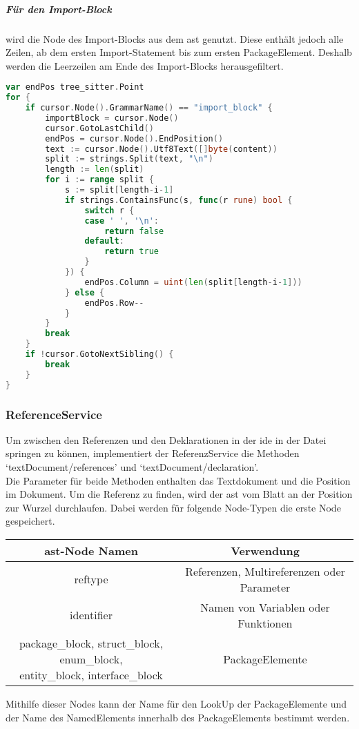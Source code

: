 \documentclass[./einleitung.tex]{subfiles}
\begin{document}
    \subparagraph{Für den Import-Block} wird die Node des Import-Blocks aus dem \acrshort{ast} genutzt.
    Diese enthält jedoch alle Zeilen, ab dem ersten Import-Statement bis zum ersten PackageElement.
    Deshalb werden die Leerzeilen am Ende des Import-Blocks herausgefiltert.
    \begin{lstlisting}[language=Go, caption=Filterung der leeren Zeilen, label=lst:filterImportFolding]
var endPos tree_sitter.Point
for {
    if cursor.Node().GrammarName() == "import_block" {
        importBlock = cursor.Node()
        cursor.GotoLastChild()
        endPos = cursor.Node().EndPosition()
        text := cursor.Node().Utf8Text([]byte(content))
        split := strings.Split(text, "\n")
        length := len(split)
        for i := range split {
            s := split[length-i-1]
            if strings.ContainsFunc(s, func(r rune) bool {
                switch r {
                case ' ', '\n':
                    return false
                default:
                    return true
                }
            }) {
                endPos.Column = uint(len(split[length-i-1]))
            } else {
                endPos.Row--
            }
        }
        break
    }
    if !cursor.GotoNextSibling() {
        break
    }
}
    \end{lstlisting}

    \subsubsection[ReferenceService]{ReferenceService }\label{subsubsec:reference-service}
    Um zwischen den Referenzen und den Deklarationen in der \acrshort{ide} in der Datei springen zu können, implementiert der ReferenzService die Methoden `textDocument/references' und `textDocument/declaration'. \\
    Die Parameter für beide Methoden enthalten das Textdokument und die Position im Dokument.
    Um die Referenz zu finden, wird der \acrshort{ast} vom Blatt an der Position zur Wurzel durchlaufen.
    Dabei werden für folgende Node-Typen die erste Node gespeichert.
    \begin{center}
        \begin{tabular}{|c|c|}
            \hline
            \acrshort{ast}-Node Namen & Verwendung \\
            \hline
            reftype & Referenzen, Multireferenzen oder Parameter \\
            \hline
            identifier & Namen von Variablen oder Funktionen\\
            \hline
            \makecell{package_block, struct_block, enum_block,\\entity_block, interface_block}& PackageElemente\\
            \hline
        \end{tabular}
    \end{center}
    Mithilfe dieser Nodes kann der Name für den LookUp der PackageElemente und der Name des NamedElements innerhalb des PackageElements bestimmt werden.
\end{document}
